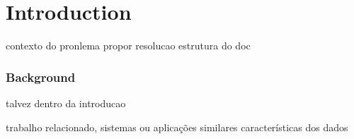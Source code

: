 \chapter{Introduction}
contexto do pronlema
propor resolucao
estrutura do doc

\subsection*{Background}
talvez dentro da introducao

trabalho relacionado, sistemas ou aplicações similares
características dos dados